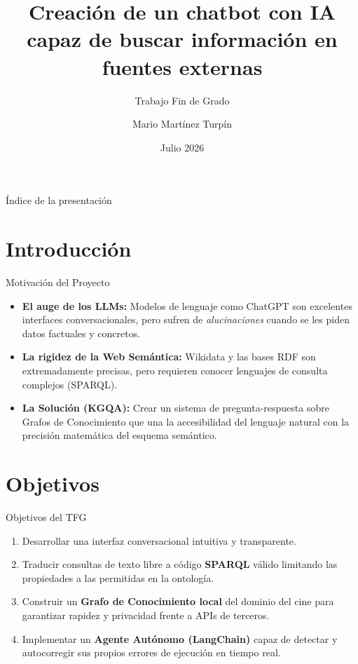 \documentclass[11pt,aspectratio=169]{beamer}
\title[KGQA Chatbot]{Creación de un chatbot con IA capaz de buscar información en fuentes externas}
\subtitle{Trabajo Fin de Grado}
\author[M. Martínez Turpín]{Mario Martínez Turpín}
\institute[FIUM]{
  Facultad de Informática \\
  Universidad de Murcia
}
\date{Julio 2026} %
\begin{document}
\begin{frame}
  \titlepage
\end{frame}

\begin{frame}{Índice de la presentación}
  \tableofcontents
\end{frame}

\section{Introducción}
\begin{frame}{Motivación del Proyecto}
  \begin{itemize}
    \item \textbf{El auge de los LLMs:} Modelos de lenguaje como ChatGPT son excelentes interfaces conversacionales, pero sufren de \textit{alucinaciones} cuando se les piden datos factuales y concretos.
    \vspace{0.3cm}
    \item \textbf{La rigidez de la Web Semántica:} Wikidata y las bases RDF son extremadamente precisas, pero requieren conocer lenguajes de consulta complejos (SPARQL).
    \vspace{0.3cm}
    \item \textbf{La Solución (KGQA):} Crear un sistema de pregunta-respuesta sobre Grafos de Conocimiento que una la accesibilidad del lenguaje natural con la precisión matemática del esquema semántico.
  \end{itemize}
\end{frame}

\section{Objetivos}
\begin{frame}{Objetivos del TFG}
  \begin{enumerate}
    \item Desarrollar una interfaz conversacional intuitiva y transparente.
    \vspace{0.2cm}
    \item Traducir consultas de texto libre a código \textbf{SPARQL} válido limitando las propiedades a las permitidas en la ontología.
    \vspace{0.2cm}
    \item Construir un \textbf{Grafo de Conocimiento local} del dominio del cine para garantizar rapidez y privacidad frente a APIs de terceros.
    \vspace{0.2cm}
    \item Implementar un \textbf{Agente Autónomo (LangChain)} capaz de detectar y autocorregir sus propios errores de ejecución en tiempo real.
  \end{enumerate}
\end{frame}
\end{document}
